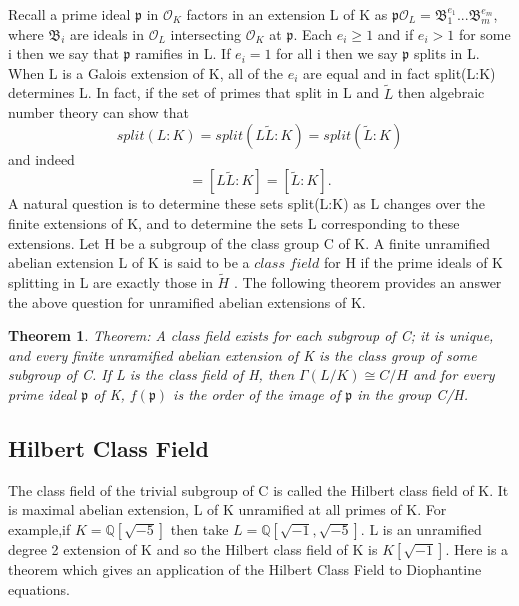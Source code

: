 \documentclass[preprint,12pt,leqno]{elsarticle}
\newtheorem{theorem}{Theorem}
\begin{document}
Recall a prime ideal $\mathfrak{p}$ in $\mathcal{O}_K$ factors in an extension L of K as
\newline
$\mathfrak{p}\mathcal{O}_L=\mathfrak{B}_1^{e_1}...\mathfrak{B}_m^{e_m}$, where $\mathfrak{B}_i$ are ideals in $\mathcal{O}_L$ intersecting $\mathcal{O}_K$ at $\mathfrak{p}$. Each $e_i\geq1$ and if $e_i>1$ for some i then we say that $\mathfrak{p}$ ramifies in L. If $e_i=1$ for all i then we say $\mathfrak{p}$ splits in L.
\newline
When L is a Galois extension of K, all of the $e_i$ are equal and in fact split(L:K) determines L.
\newline
In fact, if the set of primes that split in L and $\tilde{L}$ then algebraic number theory can show that
\begin{equation}
 split(L:K)=split(L\tilde{L}:K)=split(\tilde{L}:K)
\end{equation}
 and indeed 
 \begin{equation}
 [L:K]=[L\tilde{L}:K]=[\tilde{L}:K].
 \end{equation}
A natural question is to determine these sets split(L:K) as L changes over the finite extensions of K, and to determine the sets L corresponding to these extensions.
\newline
Let H be a subgroup of the class group C of K. A finite unramified abelian extension L of K is said to be a $\textit{class field}$ for H if the prime ideals of K splitting in L are exactly those in $\tilde{H}$ . The following theorem provides an answer the above question for unramified abelian extensions of K.
\begin{theorem}
Theorem: A class field exists for each subgroup of C; it is unique, and every finite unramified abelian extension of K is the class group of some subgroup of C. If L is the class field of H, then $\Gamma(L/K)\cong C/H$ and for every prime ideal $\mathfrak{p}$ of K, $f(\mathfrak{p})$ is the order of the image of $\mathfrak{p}$ in the group C/H.
\end{theorem}
\subsection{Hilbert Class Field}
The class field of the trivial subgroup of C is called the Hilbert class field of K. It is maximal abelian extension, L of K unramified at all primes of K.
\newline
For example,if $K=\mathbb{Q}[\sqrt{-5}]$ then take $L=\mathbb{Q}[\sqrt{-1},\sqrt{-5}]$. L is an unramified degree 2 extension of K and so the Hilbert class field of K is $K[\sqrt{-1}]$. Here is a theorem which gives an application of the Hilbert Class Field to Diophantine equations.
\newline
\end{document}
